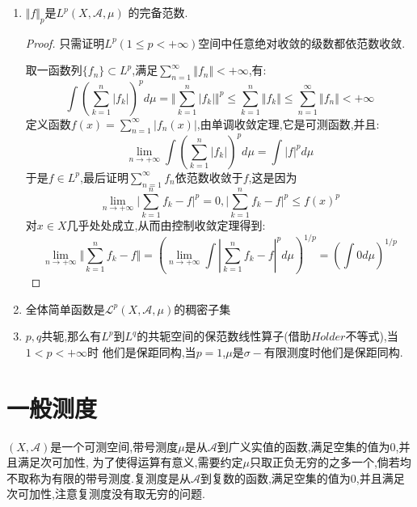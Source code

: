 \begin{enumerate}
  \item $\Vert f\Vert_p$是$L^p(X,\mathscr{A},\mu)$ 的完备范数.
  \begin{proof}
  只需证明$L^p(1\le p<+\infty)$空间中任意绝对收敛的级数都依范数收敛.

  取一函数列$\{f_n\}\subset L^p$,满足$\sum_{n=1}^{\infty}\Vert f_n\Vert<+\infty$,有:
  $$\int\left(\sum_{k=1}^n\vert f_k\vert\right)^p d\mu
  =\Vert\sum_{k=1}^n\vert f_k\vert\Vert^p\le\sum_{k=1}^n\Vert f_k\Vert\le\sum_{n=1}^{\infty}\Vert f_n\Vert<+\infty$$
  定义函数$f(x)=\sum_{n=1}^{\infty}\vert f_n(x)\vert$,由单调收敛定理,它是可测函数,并且:
  $$\lim_{n\to+\infty}\int\left(\sum_{k=1}^n\vert f_k\vert\right)^p d\mu=\int\vert f\vert^pd\mu$$
  于是$f\in L^p$,最后证明$\sum_{n=1}^{\infty}f_n$依范数收敛于$f$,这是因为
  $$\lim_{n\to+\infty}\vert\sum_{k=1}^nf_k-f\vert^p=0,\vert\sum_{k=1}^nf_k-f\vert^p\le f(x)^p$$
  对$x\in X$几乎处处成立,从而由控制收敛定理得到:
  $$\lim_{n\to+\infty}\Vert\sum_{k=1}^{n}f_k-f\Vert=\left(\lim_{n\to+\infty}\int\left|\sum_{k=1}^{n}f_k-f\right|^pd\mu\right)^{1/p}=
  \left(\int 0d\mu\right)^{1/p}$$
  \end{proof}
  \item 全体简单函数是$\mathscr{L}^p(X,\mathscr{A},\mu)$的稠密子集
  \item $p,q$共轭,那么有$L^p$到$L^q$的共轭空间的保范数线性算子(借助$Holder$不等式),当$1<p<+\infty$时
  他们是保距同构,当$p=1$,$\mu$是$\sigma-$有限测度时他们是保距同构.
\end{enumerate}

\section{一般测度}

$(X,\mathscr{A})$是一个可测空间,带号测度$\mu$是从$\mathscr{A}$到广义实值的函数,满足空集的值为0,并且满足次可加性,
为了使得运算有意义,需要约定$\mu$只取正负无穷的之多一个,倘若均不取称为有限的带号测度.复测度是从$\mathscr{A}$到复数的函数,满足空集的值为0,并且满足次可加性,注意复测度没有取无穷的问题.

